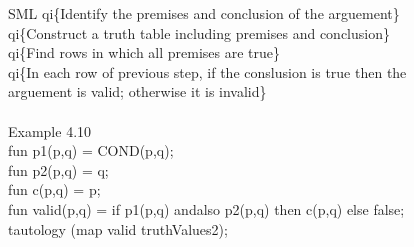 \documentclass{ffslides}
\begin{document}
{\begin{GFT}{SML}
\+\Backslash{}qi\{Identify the premises and conclusion of the arguement\}\\
\+\Backslash{}qi\{Construct a truth table including premises and conclusion\}\\
\+\Backslash{}qi\{Find rows in which all premises are true\}\\
\+\Backslash{}qi\{In each row of previous step, if the conslusion is true then the\\
\+arguement is valid; otherwise it is invalid\}\\
\+\\
\+Example 4.10\\
\+fun p1(p,q) = COND(p,q);\\
\+fun p2(p,q) = q;\\
\+fun c(p,q) = p;\\
\+fun valid(p,q) = if p1(p,q) andalso p2(p,q) then c(p,q) else false;\\
\+tautology (map valid truthValues2);\\
\end{GFT}
}
\end{document}
